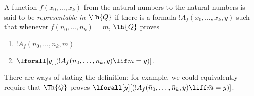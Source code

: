 \documentclass[../../include/open-logic-section]{subfiles}
\begin{document}

\begin{defn}
  A function $f(x_0,\ldots,x_k)$ from the natural numbers to
  the natural numbers is said to be {\em representable in $\Th{Q}$} if
  there is a formula $!A_f(x_0,\dots,x_k,y)$ such that whenever
  $f(n_0,\dots,n_k) = m$, $\Th{Q}$ proves
\begin{enumerate}
\item $!A_f(\bar n_0, \dots, \bar n_k,\bar m)$
\item $\lforall[y][(!A_f(\bar n_0, \dots, \bar n_k,y) \lif \bar m = y)]$.
\end{enumerate}
\end{defn}

There are ways of stating the definition; for example, we could
equivalently require that $\Th{Q}$ proves $\lforall[y][(!A_f(\bar n_0, \dots,
\bar n_k,y) \liff \bar m = y)]$.
\end{document}
